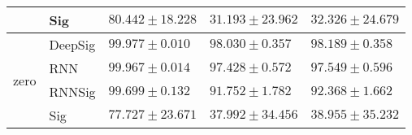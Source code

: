 \begin{tabular}{lllll}
                        & Sig     &                          $ 80.442 \pm 18.228 $ &                          $ 31.193 \pm 23.962 $ &                          $ 32.326 \pm 24.679 $ \\
\midrule
\multirow{4}{*}{zero}   & DeepSig &               $  \mathbf{ 99.977 \pm 0.010 } $ &                           $ 98.030 \pm 0.357 $ &                           $ 98.189 \pm 0.358 $ \\
                        & RNN     &                           $ 99.967 \pm 0.014 $ &                           $ 97.428 \pm 0.572 $ &                           $ 97.549 \pm 0.596 $ \\
                        & RNNSig  &                           $ 99.699 \pm 0.132 $ &                           $ 91.752 \pm 1.782 $ &                           $ 92.368 \pm 1.662 $ \\
                        & Sig     &                          $ 77.727 \pm 23.671 $ &                          $ 37.992 \pm 34.456 $ &                          $ 38.955 \pm 35.232 $ \\
\bottomrule
\end{tabular}
